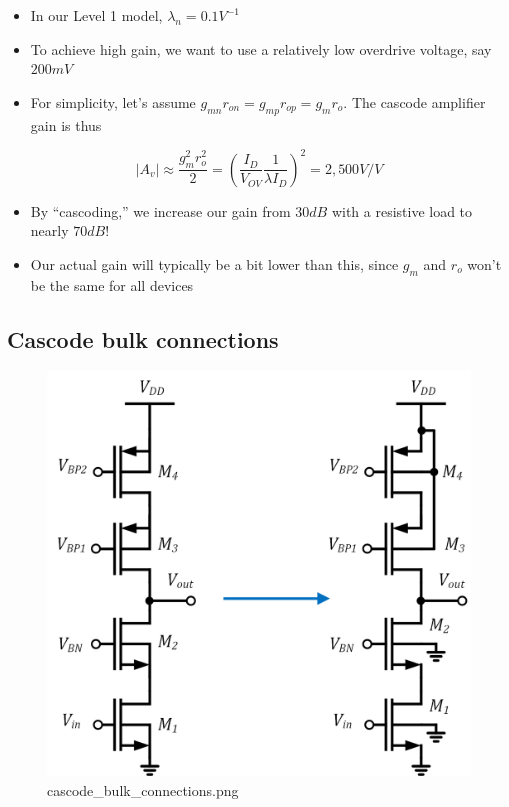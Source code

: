 \documentclass[11pt]{article}
\providecommand{\tightlist}{%
      \setlength{\itemsep}{0pt}\setlength{\parskip}{0pt}}
\begin{document}
    \begin{itemize}
\tightlist
\item
  In our Level 1 model, \(\lambda_n = 0.1V^{-1}\)
\item
  To achieve high gain, we want to use a relatively low overdrive
  voltage, say \(200mV\)
\item
  For simplicity, let's assume \(g_{mn}r_{on} = g_{mp}r_{op} = g_mr_o\).
  The cascode amplifier gain is thus
\end{itemize}

\begin{equation}
|A_v| \approx \dfrac{g_m^2r_o^2}{2} = \left( \dfrac{I_D}{V_{OV}}\dfrac{1}{\lambda I_D} \right)^2 = 2,500 V/V
\end{equation}

\begin{itemize}
\tightlist
\item
  By ``cascoding,'' we increase our gain from \(30dB\) with a resistive
  load to nearly \(70dB\)!
\item
  Our actual gain will typically be a bit lower than this, since \(g_m\)
  and \(r_o\) won't be the same for all devices
\end{itemize}

    \hypertarget{cascode-bulk-connections}{%
\subsection{Cascode bulk connections}\label{cascode-bulk-connections}}

    \begin{figure}
\centering
\includegraphics{cascode_bulk_connections.png}
\caption{cascode\_bulk\_connections.png}
\end{figure}
\end{document}
